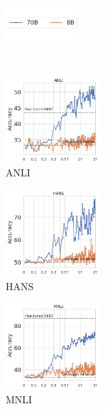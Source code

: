 \begin{figure}[t]
    \begin{subfigure}[b]{\textwidth}
        \includegraphics[width=0.3\textwidth]{figures/training_legend}
        \vspace{-2mm}
    \end{subfigure}\\
    \begin{subfigure}[b]{0.20\textwidth}
    \centering
    \includegraphics[height=3.2cm]{figures/anli_intermediate}
    \caption{ANLI}
    \end{subfigure}
    \label{fig:anli_int}
    \begin{subfigure}[b]{0.19\textwidth}
    \centering
    \includegraphics[height=3.2cm, trim=11mm 0 0 0, clip]{figures/hansnli_intermediate}
    \caption{HANS}
    \label{fig:hans_int}
    \end{subfigure}
    \begin{subfigure}[b]{0.19\textwidth}
    \centering
    \includegraphics[height=3.2cm, trim=11mm 0 0 0, clip]{figures/mnli_matched_intermediate}
    \caption{MNLI}
    \label{fig:mnli_int}
    \end{subfigure}
    \begin{subfigure}[b]{0.19\textwidth}

\end{subfigure}
\end{figure}
